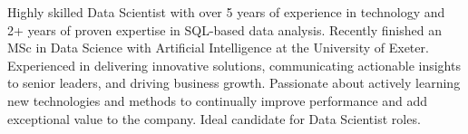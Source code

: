 
\vspace{-1mm}
\color{sectiondivider}\vhrulefill{0.9pt}
\begin{cvparagraph}


Highly skilled Data Scientist with over 5 years of experience in technology and 2+ years of proven expertise in SQL-based data analysis. Recently finished an MSc in Data Science with Artificial Intelligence at the University of Exeter. Experienced in delivering innovative solutions, communicating actionable insights to senior leaders, and driving business growth. Passionate about actively learning new technologies and methods to continually improve performance and add exceptional value to the company. Ideal candidate for Data Scientist roles.
%
\end{cvparagraph}
